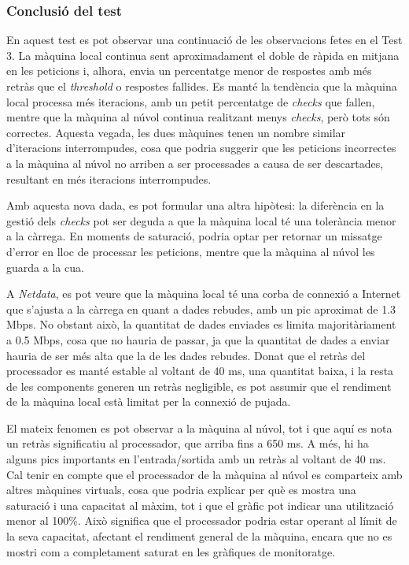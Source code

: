 \subsubsection{Conclusió del test}

En aquest test es pot observar una continuació de les observacions fetes en el Test 3. La màquina local continua sent aproximadament el doble de ràpida en mitjana en les peticions i, alhora, envia un percentatge menor de respostes amb més retràs que el \textit{threshold} o respostes fallides. Es manté la tendència que la màquina local processa més iteracions, amb un petit percentatge de \textit{checks} que fallen, mentre que la màquina al núvol continua realitzant menys \textit{checks}, però tots són correctes. Aquesta vegada, les dues màquines tenen un nombre similar d'iteracions interrompudes, cosa que podria suggerir que les peticions incorrectes a la màquina al núvol no arriben a ser processades a causa de ser descartades, resultant en més iteracions interrompudes.

Amb aquesta nova dada, es pot formular una altra hipòtesi: la diferència en la gestió dels \textit{checks} pot ser deguda a que la màquina local té una tolerància menor a la càrrega. En moments de saturació, podria optar per retornar un missatge d'error en lloc de processar les peticions, mentre que la màquina al núvol les guarda a la cua.

A \textit{Netdata}, es pot veure que la màquina local té una corba de connexió a Internet que s'ajusta a la càrrega en quant a dades rebudes, amb un pic aproximat de 1.3 Mbps. No obstant això, la quantitat de dades enviades es limita majoritàriament a 0.5 Mbps, cosa que no hauria de passar, ja que la quantitat de dades a enviar hauria de ser més alta que la de les dades rebudes. Donat que el retràs del processador es manté estable al voltant de 40 ms, una quantitat baixa, i la resta de les components generen un retràs negligible, es pot assumir que el rendiment de la màquina local està limitat per la connexió de pujada.

El mateix fenomen es pot observar a la màquina al núvol, tot i que aquí es nota un retràs significatiu al processador, que arriba fins a 650 ms. A més, hi ha alguns pics importants en l'entrada/sortida amb un retràs al voltant de 40 ms. Cal tenir en compte que el processador de la màquina al núvol es comparteix amb altres màquines virtuals, cosa que podria explicar per què es mostra una saturació i una capacitat al màxim, tot i que el gràfic pot indicar una utilització menor al 100\%. Això significa que el processador podria estar operant al límit de la seva capacitat, afectant el rendiment general de la màquina, encara que no es mostri com a completament saturat en les gràfiques de monitoratge.

